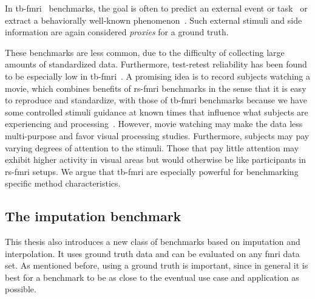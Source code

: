 In \gls{tb-fmri}~\parencite{Gonzalez-Castillo2018} benchmarks, the goal is often to predict an external event or task~\parencite[see e.g.][]{Sakoglu2010, Glerean2012, Shine2015, Monti2017, Sahib2018, Xie2019} or extract a behaviorally well-known phenomenon~\parencite[see e.g.][]{Lan2017, Warnick2018, Li2019b, Ebrahimi2020}.
Such external stimuli and side information are again considered \emph{proxies} for a ground truth.

These benchmarks are less common, due to the difficulty of collecting large amounts of standardized data.
Furthermore, test-retest reliability has been found to be especially low in \gls{tb-fmri}~\parencite{Elliott2020}.
A promising idea is to record subjects watching a movie, which combines benefits of \gls{rs-fmri} benchmarks in the sense that it is easy to reproduce and standardize, with those of \gls{tb-fmri} benchmarks because we have some controlled stimuli guidance at known times that influence what subjects are experiencing and processing~\parencite{Eickhoff2020, Finn2021}.
However, movie watching may make the data less multi-purpose and favor visual processing studies.
Furthermore, subjects may pay varying degrees of attention to the stimuli.
Those that pay little attention may exhibit higher activity in visual areas but would otherwise be like participants in \gls{rs-fmri} setups.
We argue that \gls{tb-fmri} are especially powerful for benchmarking specific method characteristics.

\subsection{The imputation benchmark}\label{subsec:imputation-benchmark}

This thesis also introduces a new class of benchmarks based on imputation and interpolation.
It uses ground truth data and can be evaluated on any \gls{fmri} data set.
As mentioned before, using a ground truth is important, since in general it is best for a benchmark to be as close to the eventual use case and application as possible.

